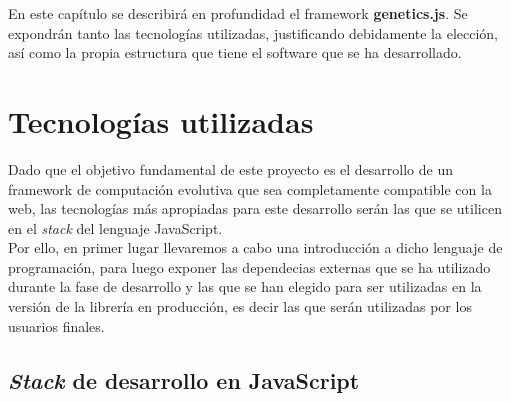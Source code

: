 

En este capítulo se describirá en profundidad el framework \textbf{genetics.js}. Se expondrán tanto las tecnologías utilizadas, justificando debidamente la elección, así como la propia estructura que tiene el software que se ha desarrollado.

\section{Tecnologías utilizadas}
\label{4:sec:1}

Dado que el objetivo fundamental de este proyecto es el desarrollo de un framework de computación evolutiva que sea completamente compatible con la web, las tecnologías más apropiadas para este desarrollo serán las que se utilicen en el \textit{stack} del lenguaje JavaScript. \\

Por ello, en primer lugar llevaremos a cabo una introducción a dicho lenguaje de programación, para luego exponer las dependecias externas que se ha utilizado durante la fase de desarrollo y las que se han elegido para ser utilizadas en la versión de la librería en producción, es decir las que serán utilizadas por los usuarios finales. 

\subsection{\textit{Stack} de desarrollo en JavaScript}

